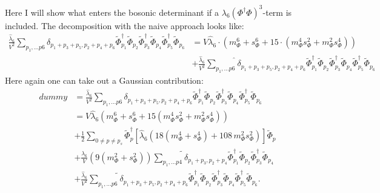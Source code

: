 Here I will show what enters the bosonic determinant if a $\lambda_6 (\Phi^{\dagger}\Phi)^3$-term is included.
The decomposition with the naive approach looks like:
\begin{align}\label{eq:naive_decomposition_of_phi6_term}
 \frac{\hat\lambda_6}{V^2}\sum\limits_{p_1,\dots p6} \delta_{p_1 + p_3 + p_5, p_2 + p_4 + p_6} 
                     \tilde\Phi_{p_1}^{\dagger} \tilde\Phi_{p_2} \tilde\Phi_{p_3}^{\dagger} \tilde\Phi_{p_4} \tilde\Phi_{p_5}^{\dagger} \tilde\Phi_{p_6}
      &=  V \hat\lambda_6 \cdot \left( m_{\Phi}^6 + s_{\Phi}^6 + 15\cdot\left(m_{\Phi}^4 s_{\Phi}^2 + m_{\Phi}^2 s_{\Phi}^4 \right) \right) 
    \nonumber \\
      & + \frac{\hat\lambda_6}{V^2}\widehat{\sum\limits_{p_1,\dots p6}} \delta_{p_1 + p_3 + p_5, p_2 + p_4 + p_6} 
                     \tilde\Phi_{p_1}^{\dagger} \tilde\Phi_{p_2} \tilde\Phi_{p_3}^{\dagger} \tilde\Phi_{p_4} \tilde\Phi_{p_5}^{\dagger} \tilde\Phi_{p_6}
\end{align}
Here again one can take out a Gaussian contribution:
\begin{align}\label{eq:alternative_decomposition_of_phi6_term}
 dummy&=\frac{\hat\lambda_6}{V^2}\sum\limits_{p_1,\dots p6} \delta_{p_1 + p_3 + p_5, p_2 + p_4 + p_6} 
                     \tilde\Phi_{p_1}^{\dagger} \tilde\Phi_{p_2} \tilde\Phi_{p_3}^{\dagger} \tilde\Phi_{p_4} \tilde\Phi_{p_5}^{\dagger} \tilde\Phi_{p_6}
    \nonumber \\
      &=  V \hat\lambda_6 \left( m_{\Phi}^6 + s_{\Phi}^6 + 15\left(m_{\Phi}^4 s_{\Phi}^2 + m_{\Phi}^2 s_{\Phi}^4 \right) \right) 
    \nonumber \\
      & +  \frac{1}{2} \sum\limits_{0\neq p\neq p_s} \tilde\Phi_p^{\dagger} \left[ \hat\lambda_6\left( 18 \left( m_{\Phi}^4 + s_{\Phi}^4 \right) 
                       + 108\,  m_{\Phi}^2 s_{\Phi}^2\right)
                       \right]   \tilde\Phi_p
    \nonumber \\
      & + \frac{\lambda_6}{V} \left( 9\left( m_{\Phi}^2 + s_{\Phi}^2 \right) \right)\widetilde{\sum\limits_{p_1,\dots p4}} \delta_{p_1 + p_3, p_2 + p_4 } 
                     \tilde\Phi_{p_1}^{\dagger} \tilde\Phi_{p_2} \tilde\Phi_{p_3}^{\dagger} \tilde\Phi_{p_4}
    \nonumber \\
      & + \frac{\hat\lambda_6}{V^2}\widetilde{\sum\limits_{p_1,\dots p6}} \delta_{p_1 + p_3 + p_5, p_2 + p_4 + p_6}
                     \tilde\Phi_{p_1}^{\dagger} \tilde\Phi_{p_2} \tilde\Phi_{p_3}^{\dagger} \tilde\Phi_{p_4} \tilde\Phi_{p_5}^{\dagger} \tilde\Phi_{p_6}.
\end{align}
